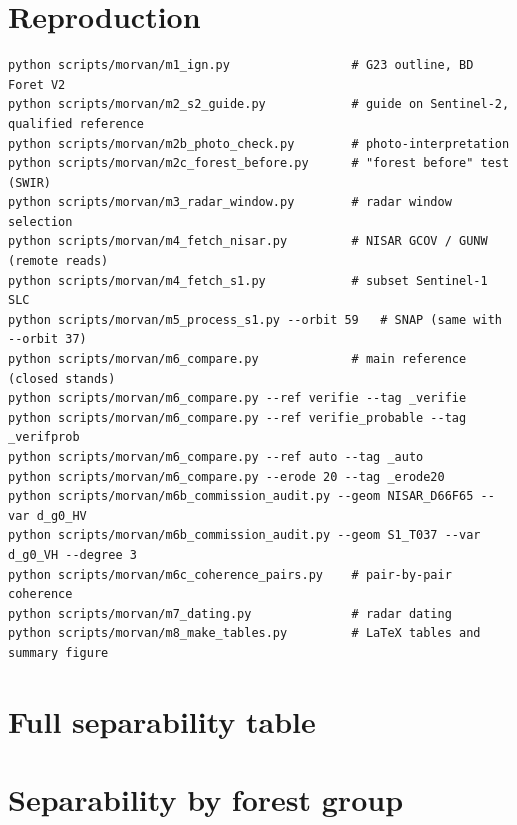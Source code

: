 \documentclass[11pt,a4paper]{article}
\begin{document}
\appendix
\section{Reproduction}
\begin{verbatim}
python scripts/morvan/m1_ign.py                 # G23 outline, BD Foret V2
python scripts/morvan/m2_s2_guide.py            # guide on Sentinel-2, qualified reference
python scripts/morvan/m2b_photo_check.py        # photo-interpretation
python scripts/morvan/m2c_forest_before.py      # "forest before" test (SWIR)
python scripts/morvan/m3_radar_window.py        # radar window selection
python scripts/morvan/m4_fetch_nisar.py         # NISAR GCOV / GUNW (remote reads)
python scripts/morvan/m4_fetch_s1.py            # subset Sentinel-1 SLC
python scripts/morvan/m5_process_s1.py --orbit 59   # SNAP (same with --orbit 37)
python scripts/morvan/m6_compare.py             # main reference (closed stands)
python scripts/morvan/m6_compare.py --ref verifie --tag _verifie
python scripts/morvan/m6_compare.py --ref verifie_probable --tag _verifprob
python scripts/morvan/m6_compare.py --ref auto --tag _auto
python scripts/morvan/m6_compare.py --erode 20 --tag _erode20
python scripts/morvan/m6b_commission_audit.py --geom NISAR_D66F65 --var d_g0_HV
python scripts/morvan/m6b_commission_audit.py --geom S1_T037 --var d_g0_VH --degree 3
python scripts/morvan/m6c_coherence_pairs.py    # pair-by-pair coherence
python scripts/morvan/m7_dating.py              # radar dating
python scripts/morvan/m8_make_tables.py         # LaTeX tables and summary figure
\end{verbatim}

\section{Full separability table}
\begin{table}[H]
\centering\scriptsize
\caption{All variables, main reference (cut / forest means, Cohen's d, AUC and 95~\% CI, Jeffries-Matusita distance).}

\end{table}

\section{Separability by forest group}
\begin{table}[H]
\centering\small
\caption{Cross-pol $\Delta\gamma^0$ AUC by forest group, automatic reference (60 objects). Values close to 0.5 in
broadleaves mostly reflect reference errors (senescence).}

\end{table}
\end{document}
